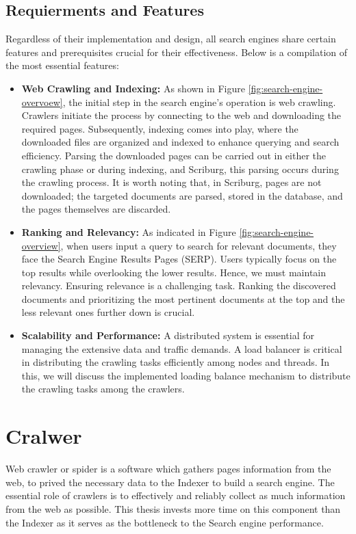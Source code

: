 \subsection{Requierments and Features}
Regardless of their implementation and design, all search engines share certain features and prerequisites crucial for their effectiveness. Below is a compilation of the most essential features: 

\begin{itemize}
	\item[] \textbf{Web Crawling and Indexing:} As shown in Figure \ref{fig:search-engine-overvoew}, the initial step in the search engine's operation is web crawling. Crawlers initiate the process by connecting to the web and downloading the required pages. Subsequently, indexing comes into play, where the downloaded files are organized and indexed to enhance querying and search efficiency. Parsing the downloaded pages can be carried out in either the crawling phase or during indexing, and Scriburg, this parsing occurs during the crawling process. It is worth noting that, in Scriburg, pages are not downloaded; the targeted documents are parsed, stored in the database, and the pages themselves are discarded.
  \item[] \textbf{Ranking and Relevancy:} As indicated in Figure \ref{fig:search-engine-overview}, when users input a query to search for relevant documents, they face the Search Engine Results Pages (SERP). Users typically focus on the top results while overlooking the lower results. Hence, we must maintain relevancy. Ensuring relevance is a challenging task. Ranking the discovered documents and prioritizing the most pertinent documents at the top and the less relevant ones further down is crucial. 
  \item[] \textbf{Scalability and Performance:} A distributed system is essential for managing the extensive data and traffic demands. A load balancer is critical in distributing the crawling tasks efficiently among nodes and threads. In this, we will discuss the implemented loading balance mechanism to distribute the crawling tasks among the crawlers. 

\end{itemize}

\section{Cralwer}
\label{sec:crawler}
Web crawler or spider is a software which gathers pages information from the web, to prived the necessary data to the Indexer to build a search engine. The essential role of crawlers is to effectively and reliably collect as much information from the web as possible. This thesis invests more time on this component than the Indexer as it serves as the bottleneck to the Search engine performance. 

